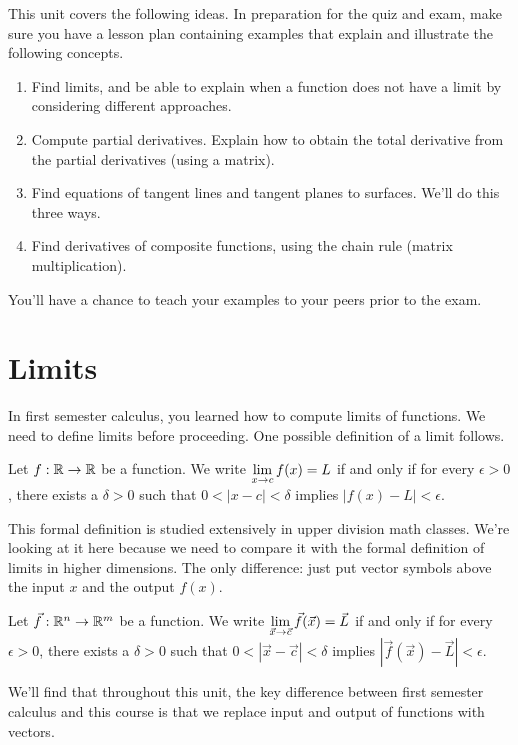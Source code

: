 

\newcommand{\derivativehomeworklink}[1]{\href{http://db.tt/cSeKG8XO}{#1}}%
%
%
\noindent 
This unit covers the following ideas. In preparation for the quiz and exam, make sure you have a lesson plan containing examples that explain and illustrate the following concepts.  
\begin{enumerate}
\item Find limits, and be able to explain when a function does not have a limit by considering different approaches.
\item Compute partial derivatives. Explain how to obtain the total derivative from the partial derivatives (using a matrix).
\item Find equations of tangent lines and tangent planes to surfaces. We'll do this three ways.
\item Find derivatives of composite functions, using the chain rule (matrix multiplication).
\end{enumerate}
You'll have a chance to teach your examples to your peers prior to the exam.

\section{Limits}
In first semester calculus, you learned how to compute limits of functions. We need to define limits before proceeding. One possible definition of a limit follows.
\begin{definition}
 Let $f:\mathbb{R}\to\mathbb{R}$ be a function.
 We write $\displaystyle \lim_{x\to c} f(x)=L$ if and only if for every $\epsilon>0$, there exists a $\delta>0$ such that $0<|x-c|<\delta$ implies $|f(x)-L|<\epsilon$.
\end{definition}
 This formal definition is studied extensively in upper division math classes. We're looking at it here because we need to compare it with the formal definition of limits in higher dimensions. The only difference: just put vector symbols above the input $x$ and the output $f(x)$.
\begin{definition}
 Let $\vec f:\mathbb{R}^n\to\mathbb{R}^m$ be a function.
 We write $\displaystyle \lim_{\vec x\to \vec c} \vec f(\vec x)=\vec L$ if and only if for every $\epsilon>0$, there exists a $\delta>0$ such that $0<|\vec x-\vec c|<\delta$ implies $|\vec f(\vec x)-\vec L|<\epsilon$.
\end{definition}
We'll find that throughout this unit, the key difference between first semester calculus and this course is that we replace input and output of functions with vectors. 
 
